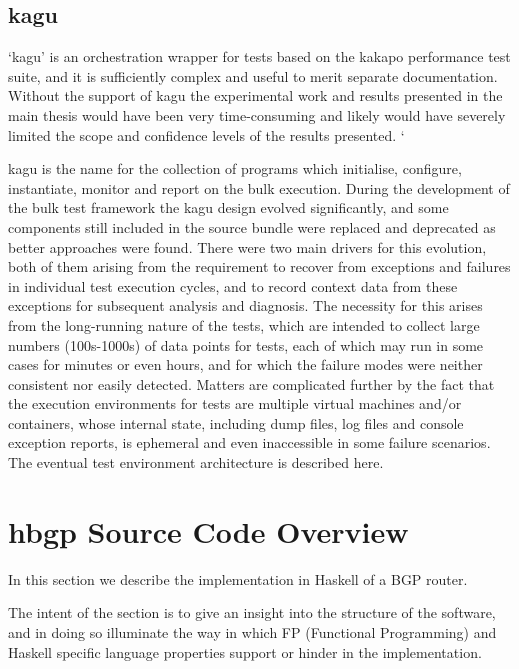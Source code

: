 \subsection{kagu}

 ‘kagu’ is an orchestration wrapper for tests based on the kakapo performance test suite, and it is sufficiently complex and useful to merit separate documentation.  Without the support of kagu the experimental work and results presented in the main thesis would have been very time-consuming and likely would have severely limited the scope and confidence levels of the results presented.  `


kagu is the name for the collection of programs which initialise, configure, instantiate, monitor and report on the bulk execution.  During the development of the bulk test framework the kagu design evolved significantly, and some components still included in the source bundle were replaced and deprecated as better approaches were found.  There were two main drivers for this evolution, both of them arising from the requirement to recover from exceptions and failures in individual test execution cycles, and to record context data from these exceptions for subsequent analysis and diagnosis.  The necessity for this arises from the long-running nature of the tests, which are intended to collect large numbers (100s-1000s) of data points for tests, each of which may run in some cases for  minutes or even hours, and for which the failure modes were neither consistent nor easily detected.  Matters are complicated further by the fact that the execution environments for tests are multiple virtual machines and/or containers, whose internal state, including dump files, log files and console exception reports, is ephemeral and even inaccessible in some failure scenarios.  The eventual test environment architecture is described here.

\section{hbgp Source Code Overview}

In this section we describe the implementation in Haskell of a BGP router.

The intent of the section is to give an insight into the structure of the software, and in doing so illuminate the way in which FP (Functional Programming) and  Haskell specific language properties support or hinder in the implementation.

